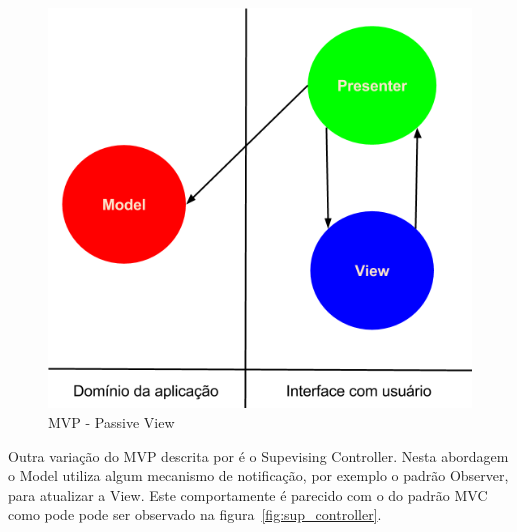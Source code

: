 \documentclass[conference]{IEEEtran}
\begin{document}
\begin{figure}[htb]
	\begin{center}
		\includegraphics[scale=0.25]{img/passive_view.png}
	\end{center}
	\caption{\label{fig:mvp_passive_view} MVP - Passive View}
	
\end{figure}

Outra variação do MVP descrita por \cite{fowler:sp} é o Supevising
Controller. Nesta abordagem o Model utiliza algum mecanismo de notificação, por
exemplo o padrão Observer, para atualizar a View. Este comportamente é parecido
com o do padrão MVC como pode pode ser observado na
figura~\ref{fig:sup_controller}.
\end{document}
